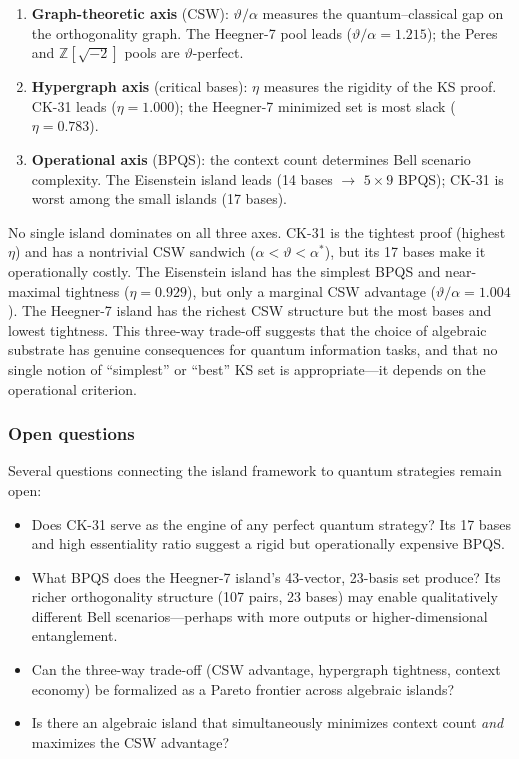 \documentclass[12pt,a4paper]{article}
\newcommand{\Z}{\mathbb{Z}}
\begin{document}
\begin{enumerate}
    \item \textbf{Graph-theoretic axis} (CSW): $\vartheta/\alpha$ measures the quantum--classical gap on the orthogonality graph. The Heegner-7 pool leads ($\vartheta/\alpha = 1.215$); the Peres and $\Z[\sqrt{-2}]$ pools are $\vartheta$-perfect.
    \item \textbf{Hypergraph axis} (critical bases): $\eta$ measures the rigidity of the KS proof. CK-31 leads ($\eta = 1.000$); the Heegner-7 minimized set is most slack ($\eta = 0.783$).
    \item \textbf{Operational axis} (BPQS): the context count determines Bell scenario complexity. The Eisenstein island leads (14 bases $\to$ $5 \times 9$ BPQS); CK-31 is worst among the small islands (17 bases).
\end{enumerate}

\noindent No single island dominates on all three axes. CK-31 is the tightest proof (highest $\eta$) and has a nontrivial CSW sandwich ($\alpha < \vartheta < \alpha^*$), but its 17 bases make it operationally costly. The Eisenstein island has the simplest BPQS and near-maximal tightness ($\eta = 0.929$), but only a marginal CSW advantage ($\vartheta/\alpha = 1.004$). The Heegner-7 island has the richest CSW structure but the most bases and lowest tightness. This three-way trade-off suggests that the choice of algebraic substrate has genuine consequences for quantum information tasks, and that no single notion of ``simplest'' or ``best'' KS set is appropriate---it depends on the operational criterion.

\subsubsection{Open questions}

Several questions connecting the island framework to quantum strategies remain open:

\begin{itemize}
    \item Does CK-31 serve as the engine of any perfect quantum strategy? Its 17 bases and high essentiality ratio suggest a rigid but operationally expensive BPQS.
    \item What BPQS does the Heegner-7 island's 43-vector, 23-basis set produce? Its richer orthogonality structure (107 pairs, 23 bases) may enable qualitatively different Bell scenarios---perhaps with more outputs or higher-dimensional entanglement.
    \item Can the three-way trade-off (CSW advantage, hypergraph tightness, context economy) be formalized as a Pareto frontier across algebraic islands?
    \item Is there an algebraic island that simultaneously minimizes context count \emph{and} maximizes the CSW advantage?
\end{itemize}
\end{document}
